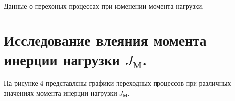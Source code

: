 \documentclass[a4paper, 11pt]{article}
\begin{document}
\begin{table}[h!]
    \centering
    \caption{Данные о перехоных процессах при изменении момента нагрузки.}
\end{table}

\section*{Исследование влеяния момента инерции нагрузки $J_\text{М}$.}
На рисунке 4 представлены графики переходных процессов при различных значениях момента инерции нагрузки $J_\text{М}$.
\end{document}
